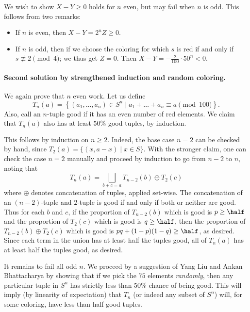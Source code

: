 We wish to show $X-Y \ge 0$ holds for $n$ even,
but may fail when $n$ is odd.
This follows from two remarks:
\begin{itemize}
  \item If $n$ is even, then $X-Y = 2^n Z \ge 0$.
  \item If $n$ is odd,
  then if we choose the coloring for which
  $s$ is red if and only if $s \not\equiv 2 \pmod 4$;
  we thus get $Z = 0$.
  Then $X-Y = -\frac 2{100} \cdot 50^n < 0$.
\end{itemize}

\paragraph{Second solution by strengthened induction and random coloring.}
We again prove that $n$ even work.
Let us define
\[
  T_n(a) = \left\{ (a_1, \dots, a_n) \in S^n
    \mid a_1 + \dots + a_n \equiv a \pmod{100} \right\}.
\]
Also, call an $n$-tuple good if it has an even number of red elements.
We claim that $T_n(a)$ also has at least 50\% good tuples, by induction.

This follows by induction on $n \ge 2$.
Indeed, the base case $n = 2$ can be checked by hand,
since $T_2(a) = \{ (x, a-x) \mid x \in S \}$.
With the stronger claim, one can check the case $n=2$ manually
and proceed by induction to go from $n-2$ to $n$, noting that
\[ T_{n}(a) =
  \bigsqcup_{b+c=a} T_{n-2}(b) \oplus T_2(c) \]
where $\oplus$ denotes concatenation of tuples, applied set-wise.
The concatenation of an $(n-2)$-tuple and $2$-tuple is good
if and only if both or neither are good.
Thus for each $b$ and $c$,
if the proportion of $T_{n-2}(b)$ which is good is $p \ge \half$
and the proportion of $T_2(c)$ which is good is $q \ge \half$,
then the proportion of $T_{n-2}(b) \oplus T_2(c)$ which is good
is $pq + (1-p)(1-q) \ge \half$, as desired.
Since each term in the union has at least half the tuples good,
all of $T_n(a)$ has at least half the tuples good, as desired.

It remains to fail all odd $n$.
We proceed by a suggestion of Yang Liu and Ankan Bhattacharya
by showing that if we pick the $75$ elements \emph{randomly},
then any particular tuple in $S^n$ has strictly less than 50\% chance of being good.
This will imply (by linearity of expectation)
that $T_n$ (or indeed any subset of $S^n$) will, for some coloring,
have less than half good tuples.

